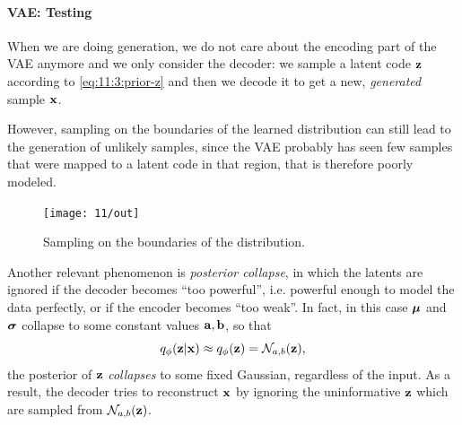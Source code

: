 \paragraph{VAE: Testing}
When we are doing generation, we do not care about the encoding part of the VAE anymore and we only consider the decoder: we sample a latent code $\vb{z}$ according to \cref{eq:11:3:prior-z} and then we decode it to get a new, \emph{generated} sample $\vb{x}$.

However, sampling on the boundaries of the learned distribution can still lead to the generation of unlikely samples, since the VAE probably has seen few samples that were mapped to a latent code in that region, that is therefore poorly modeled.
\begin{figure}[H]
	\centering
	\texttt{[image: 11/out]}
	\caption{Sampling on the boundaries of the distribution.}\label{fig:unlikely_samples}	
\end{figure}

Another relevant phenomenon is \emph{posterior collapse}, in which the latents are ignored if the decoder becomes ``too powerful'', i.e. powerful enough to model the data perfectly, or if the encoder becomes ``too weak''. In fact, in this case $\vb*{\mu}$ and $\vb*{\sigma}$ collapse to some constant values $\vb{a}, \vb{b}$, so that
\begin{equation}
    q_{\phi}(\vb{z} | \vb{x}) \approx q_{\phi}(\vb{z}) = \mathcal{N}_{a, b}(\vb{z}),
\end{equation} 
the posterior of $\vb{z}$ \emph{collapses} to some fixed Gaussian, regardless of the input.
As a result, the decoder tries to reconstruct $\vb{x}$ by ignoring the uninformative $\vb{z}$ which are sampled from $\mathcal{N}_{a, b}(\vb{z})$.

